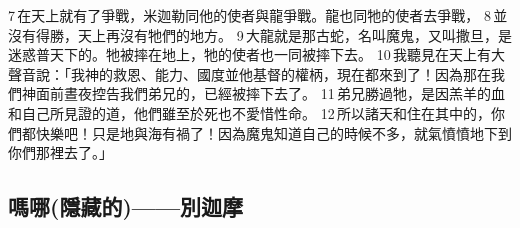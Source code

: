 7 在天上就有了爭戰，米迦勒同他的使者與龍爭戰。龍也同牠的使者去爭戰， 8 並沒有得勝，天上再沒有牠們的地方。 9 大龍就是那古蛇，名叫魔鬼，又叫撒旦，是迷惑普天下的。牠被摔在地上，牠的使者也一同被摔下去。 10 我聽見在天上有大聲音說：「我神的救恩、能力、國度並他基督的權柄，現在都來到了！因為那在我們神面前晝夜控告我們弟兄的，已經被摔下去了。 11 弟兄勝過牠，是因羔羊的血和自己所見證的道，他們雖至於死也不愛惜性命。 12 所以諸天和住在其中的，你們都快樂吧！只是地與海有禍了！因為魔鬼知道自己的時候不多，就氣憤憤地下到你們那裡去了。」







\subsection{嗎哪(隱藏的)——別迦摩}

